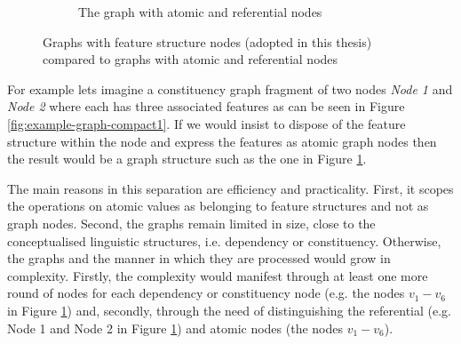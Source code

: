 \begin{figure}[!ht]
\begin{subfigure}[b]{0.45\textwidth}
            \caption{The graph with atomic and referential nodes}
            \label{fig:example-graph-compact2}
        \end{subfigure}%
        \caption{Graphs with feature structure nodes (adopted in this thesis) compared to graphs with atomic and referential nodes}
        \label{fig:example-graph-compact}
    \end{figure}

    For example lets imagine a constituency graph fragment of two nodes \textit{Node 1} and \textit{Node 2} where each has three associated features as can be seen in Figure \ref{fig:example-graph-compact1}. If we would insist to dispose of the feature structure within the node and express the features as atomic graph nodes then the result would be a graph structure such as the one in Figure \ref{fig:example-graph-compact2}.

    The main reasons in this separation are efficiency and practicality. First, it scopes the operations on atomic values as belonging to feature structures and not as graph nodes. Second, the graphs remain limited in size, close to the conceptualised linguistic structures, i.e. dependency or constituency. Otherwise, the graphs and the manner in which they are processed would grow in complexity. Firstly, the complexity would manifest through at least one more round of nodes for each dependency or constituency node (e.g. the nodes $v_1 - v_6$ in Figure \ref{fig:example-graph-compact2}) and, secondly, through the need of distinguishing the referential (e.g. Node 1 and Node 2 in Figure \ref{fig:example-graph-compact2}) and atomic nodes (the nodes $v_1 - v_6$).


